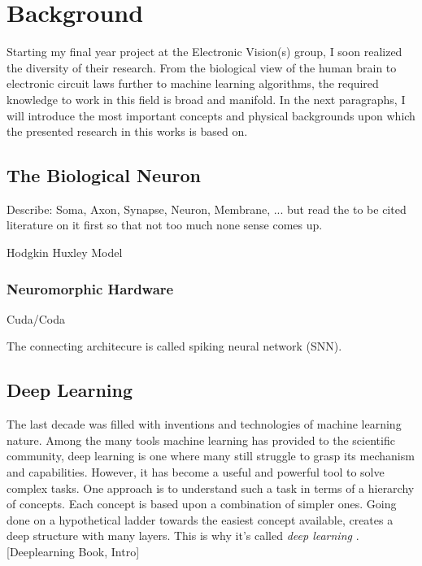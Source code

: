 \chapter{Background}
Starting my final year project at the Electronic Vision(s) group, I soon realized the diversity of their research. From the biological view of the human brain to electronic circuit laws further to machine learning algorithms, the required knowledge to work in this field is broad and manifold. In the next paragraphs, I will introduce the most important concepts and physical backgrounds upon which the presented research in this works is based on.

\section{The Biological Neuron}

Describe: Soma, Axon, Synapse, Neuron, Membrane, ... but read the to be cited literature on it first so that not too much none sense comes up.

Hodgkin Huxley Model


\subsection{Neuromorphic Hardware}
Cuda/Coda

The connecting architecure is called spiking neural network (SNN).


\section{Deep Learning}
% 
The last decade was filled with inventions and technologies of machine learning nature. Among the many tools machine learning has provided to the scientific community, deep learning is one where many still struggle to grasp its mechanism and capabilities. However, it has become a useful and powerful tool to solve complex tasks. One approach is to understand such a task in terms of a hierarchy of concepts. Each concept is based upon a combination of simpler ones. Going done on a hypothetical ladder towards the easiest concept available, creates a deep structure with many layers. This is why it's called \textit{deep learning} . [Deeplearning Book, Intro]

